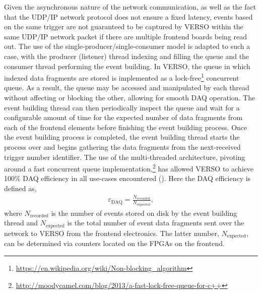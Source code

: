 Given the asynchronous nature of the network communication, as well as the fact that the UDP/IP
network protocol does not ensure a fixed latency, events based on the same trigger
are not guaranteed to be captured by VERSO within the same UDP/IP network packet if there are multiple frontend boards being read out.
The use of the single-producer/single-consumer model is adapted to such a case, with
the producer (listener) thread indexing and filling the queue and the consumer thread performing the event building.
In VERSO, the queue in which indexed data fragments are stored is implemented
as a lock-free\footnote{\url{https://en.wikipedia.org/wiki/Non-blocking_algorithm}} concurrent queue.
As a result, the queue may be accessed and manipulated by each thread without affecting or blocking
the other, allowing for smooth DAQ operation.
The event building thread can then periodically inspect the queue and wait for a configurable amount of time for the expected
number of data fragments from each of the frontend elements before finishing
the event building process.
Once the event building process is completed,
the event building thread starts the process over and begins gathering the data fragments from the next-received trigger number identifier.
The use of the multi-threaded architecture, pivoting around a fast concurrent queue
implementation,\footnote{\url{http://moodycamel.com/blog/2013/a-fast-lock-free-queue-for-c++}}
has allowed VERSO to achieve 100\% DAQ efficiency
in all use-cases encountered ({\color{red}{Section XXX for use-cases}}).
Here the DAQ efficiency is defined as,
\begin{align}
    \varepsilon_{\text{DAQ}} = \frac{ N_{\text{recorded}} }{ N_{\text{expected}} },
    \label{eq:verso_daq_eff}
\end{align}
where $N_{\text{recorded}}$ is the number of events stored on disk by the event building
thread and $N_{\text{expected}}$ is the total number of event data fragments sent
over the network to VERSO from the frontend electronics.
The latter number, $N_{\text{expected}}$, can be determined via counters located
on the FPGAs on the frontend.

\FloatBarrier

